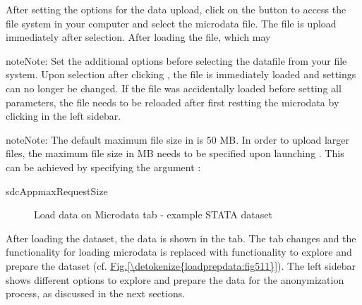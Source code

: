 \documentclass[letterpaper,10pt,english]{sphinxmanual}
\begin{document}
After setting the options for the data upload, click on the button  to access
the file system in your computer and select the microdata file. The file is upload
immediately after selection. After loading the file, which may

\begin{sphinxadmonition}{note}{Note:}
Set the additional options before selecting the datafile from your file system.
Upon selection after clicking , the file is immediately loaded and settings
can no longer be changed. If the file was accidentally loaded before setting all
parameters, the file needs to be reloaded after first restting the microdata by
clicking  in the left sidebar.
\end{sphinxadmonition}

\begin{sphinxadmonition}{note}{Note:}
The default maximum file size in  is 50 MB. In order to upload larger files,
the maximum file size in MB needs to be specified upon launching . This can
be achieved by specifying the argument :

\def\sphinxLiteralBlockLabel{\label{\detokenize{loadprepdata:id4}}}
%
\begin{sphinxVerbatim}[commandchars=\\\{\},numbers=left,firstnumber=1,stepnumber=1]
sdcAppmaxRequestSize  
\end{sphinxVerbatim}
\end{sphinxadmonition}

\begin{figure}[htbp]
\centering
\capstart

\noindent{}
\caption{Load data on Microdata tab - example STATA dataset}\label{\detokenize{loadprepdata:fig53}}\label{\detokenize{loadprepdata:id5}}\end{figure}

After loading the dataset, the data is shown in the  tab. The 
tab changes and the functionality for loading microdata is replaced with
functionality to explore and prepare the dataset (cf. \hyperref[\detokenize{loadprepdata:fig511}]{Fig.\@ \ref{\detokenize{loadprepdata:fig511}}}). The
left sidebar shows different options to explore and prepare the data for the anonymization process,
as discussed in the next sections.
\end{document}

